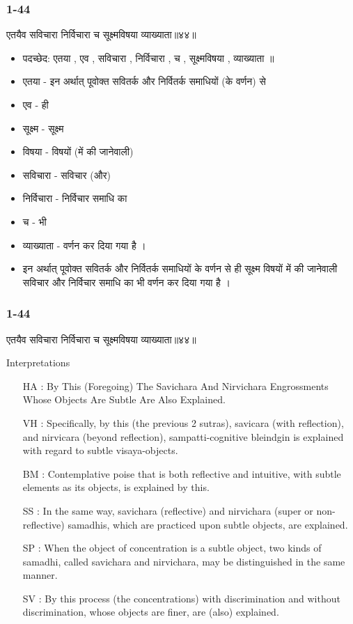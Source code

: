 \begin{frame}[fragile]\frametitle{1-44}
\begin{sanskrit}
एतयैव सविचारा निर्विचारा च सूक्ष्मविषया व्याख्याता॥४४॥
\end{sanskrit}

	\begin{itemize}
	\item पदच्छेद: एतया , एव , सविचारा , निर्विचारा , च , सूक्ष्मविषया , व्याख्याता ॥
	\item एतया - इन अर्थात् पूवोक्त सवितर्क और निर्वितर्क समाधियों (के वर्णन) से
	\item एव - ही
	\item सूक्ष्म - सूक्ष्म
	\item विषया - विषयों (में की जानेवाली)
	\item सविचारा - सविचार (और)
	\item निर्विचारा - निर्विचार समाधि का
	\item च - भी
	\item व्याख्याता - वर्णन कर दिया गया है ।
	\item इन अर्थात् पूवोक्त सवितर्क और निर्वितर्क समाधियों के वर्णन से ही सूक्ष्म विषयों में की जानेवाली सविचार और निर्विचार समाधि का भी वर्णन कर दिया गया है ।
	\end{itemize}
	
\end{frame}

\begin{frame}[fragile]\frametitle{1-44}
\begin{sanskrit}
एतयैव सविचारा निर्विचारा च सूक्ष्मविषया व्याख्याता॥४४॥
\end{sanskrit}

Interpretations
\begin{itemize}
\item [HA]: By This (Foregoing) The Savichara And Nirvichara Engrossments Whose Objects Are Subtle Are Also Explained.
\item [VH]: Specifically, by this (the previous 2 sutras), savicara (with reflection), and nirvicara (beyond reflection), sampatti-cognitive bleindgin is explained with regard to subtle visaya-objects.
\item [BM]: Contemplative poise that is both reflective and intuitive, with subtle elements as its objects, is explained by this.
\item [SS]: In the same way, savichara (reflective) and nirvichara (super or non-reflective) samadhis, which are practiced upon subtle objects, are explained.
\item [SP]: When the object of concentration is a subtle object, two kinds of samadhi, called savichara and nirvichara, may be distinguished in the same manner.
\item [SV]: By this process (the concentrations) with discrimination and without discrimination, whose objects are finer, are (also) explained. 
\end{itemize}
	
\end{frame}

